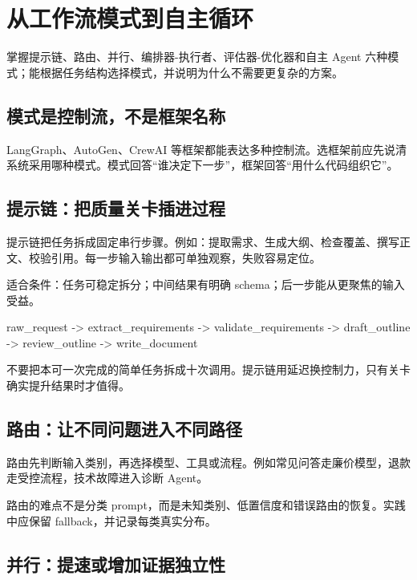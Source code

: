 \chapter{从工作流模式到自主循环}

\begin{takeaway}[学习目标]
掌握提示链、路由、并行、编排器-执行者、评估器-优化器和自主 Agent 六种模式；能根据任务结构选择模式，并说明为什么不需要更复杂的方案。
\end{takeaway}

\section{模式是控制流，不是框架名称}

LangGraph、AutoGen、CrewAI 等框架都能表达多种控制流。选框架前应先说清系统采用哪种模式。模式回答“谁决定下一步”，框架回答“用什么代码组织它”。

\section{提示链：把质量关卡插进过程}

提示链把任务拆成固定串行步骤。例如：提取需求、生成大纲、检查覆盖、撰写正文、校验引用。每一步输入输出都可单独观察，失败容易定位。

适合条件：任务可稳定拆分；中间结果有明确 schema；后一步能从更聚焦的输入受益。

\begin{codeblock}
raw_request
  -> extract_requirements
  -> validate_requirements
  -> draft_outline
  -> review_outline
  -> write_document
\end{codeblock}

不要把本可一次完成的简单任务拆成十次调用。提示链用延迟换控制力，只有关卡确实提升结果时才值得。

\section{路由：让不同问题进入不同路径}

路由先判断输入类别，再选择模型、工具或流程。例如常见问答走廉价模型，退款走受控流程，技术故障进入诊断 Agent。

路由的难点不是分类 prompt，而是未知类别、低置信度和错误路由的恢复。实践中应保留 fallback，并记录每类真实分布。

\section{并行：提速或增加证据独立性}

